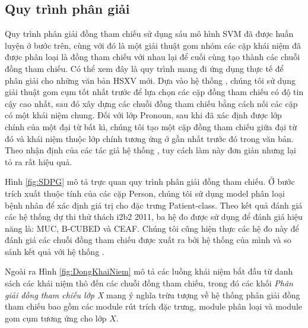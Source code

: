 \subsection*{Quy trình phân giải}
Quy trình phân giải đồng tham chiếu sử dụng sáu mô hình SVM đã được huấn luyện ở bước trên, cùng với đó là một giải thuật gom nhóm các cặp khái niệm đã được phân loại là đồng tham chiếu với nhau lại để cuối cùng tạo thành các chuỗi đồng tham chiếu. Có thể xem đây là quy trình mang đi ứng dụng thực tế để phân giải cho những văn bản HSXV mới. Dựa vào hệ thống \cite{YanXu2012}, chúng tôi sử dụng giải thuật gom cụm tốt nhất trước để lựa chọn các cặp đồng tham chiếu có độ tin cậy cao nhất, sau đó xây dựng các chuỗi đồng tham chiếu bằng cách nối các cặp có một khái niệm chung. Đối với lớp Pronoun, sau khi đã xác định được lớp chính của một đại từ bất kì, chúng tôi tạo một cặp đồng tham chiếu giữa đại từ đó và khái niệm thuộc lớp chính tương ứng ở gần nhất trước đó trong văn bản. Theo nhận định của các tác giả hệ thống \cite{YanXu2012}, tuy cách làm này đơn giản nhưng lại tỏ ra rất hiệu quả.

Hình \ref{fig:SDPG} mô tả trực quan quy trình phân giải đồng tham chiếu. Ở bước trích xuất thuộc tính của các cặp Person, chúng tôi sử dụng model phân loại bệnh nhân để xác định giá trị cho đặc trưng Patient-class. Theo kết quả đánh giá các hệ thống dự thi thử thách i2b2 2011, ba hệ đo được sử dụng để đánh giá hiệu năng là: MUC, B-CUBED và CEAF. Chúng tôi cũng hiện thực các hệ đo này để đánh giá các chuỗi đồng tham chiếu được xuất ra bởi hệ thống của mình và so sánh kết quả với hệ thống \cite{YanXu2012}. 

Ngoài ra Hình \ref{fig:DongKhaiNiem} mô tả các luồng khái niệm bắt đầu từ danh sách các khái niệm thô đến các chuỗi đồng tham chiếu, trong đó các khối \emph{Phân giải đồng tham chiếu lớp X} mang ý nghĩa trừu tượng về hệ thống phân giải đồng tham chiếu bao gồm các module rút trích đặc trưng, module phân loại và module gom cụm tương ứng cho lớp $X$.

